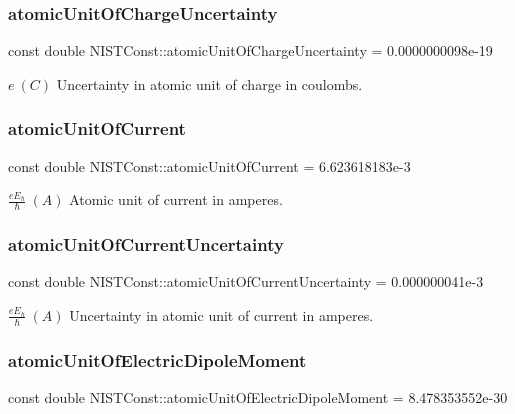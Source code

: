 \subsubsection{\texorpdfstring{atomic\+Unit\+Of\+Charge\+Uncertainty}{atomicUnitOfChargeUncertainty}}
{\footnotesize\ttfamily const double N\+I\+S\+T\+Const\+::atomic\+Unit\+Of\+Charge\+Uncertainty = 0.\+0000000098e-\/19}

$e \ (C)$ Uncertainty in atomic unit of charge in coulombs. \mbox{\label{group___atomic_unit_ga6d0f3cfc8aaa2aeb120559aaea2dc5c6}} 
\subsubsection{\texorpdfstring{atomic\+Unit\+Of\+Current}{atomicUnitOfCurrent}}
{\footnotesize\ttfamily const double N\+I\+S\+T\+Const\+::atomic\+Unit\+Of\+Current = 6.\+623618183e-\/3}

$\frac{e E_h}{\hbar} \ (A)$ Atomic unit of current in amperes. \mbox{\label{group___atomic_unit_gaef0b7cef2d2f63889e17b26d37173d3d}} 
\subsubsection{\texorpdfstring{atomic\+Unit\+Of\+Current\+Uncertainty}{atomicUnitOfCurrentUncertainty}}
{\footnotesize\ttfamily const double N\+I\+S\+T\+Const\+::atomic\+Unit\+Of\+Current\+Uncertainty = 0.\+000000041e-\/3}

$ \frac{e E_h}{\hbar} \ (A)$ Uncertainty in atomic unit of current in amperes. \mbox{\label{group___atomic_unit_ga108a8be4e32eddd7cdfdf4473f3532ab}} 
\subsubsection{\texorpdfstring{atomic\+Unit\+Of\+Electric\+Dipole\+Moment}{atomicUnitOfElectricDipoleMoment}}
{\footnotesize\ttfamily const double N\+I\+S\+T\+Const\+::atomic\+Unit\+Of\+Electric\+Dipole\+Moment = 8.\+478353552e-\/30}

